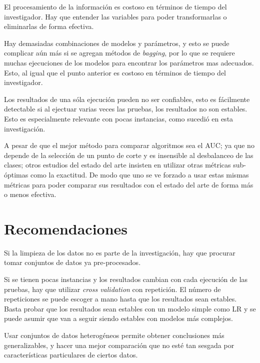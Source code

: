 El procesamiento de la información es costoso en términos de tiempo del investigador. Hay que entender las variables para poder transformarlas o eliminarlas de forma efectiva.

Hay demasiadas combinaciones de modelos y parámetros, y esto se puede complicar aún más si se agregan métodos de \textit{bagging}, por lo que se requiere muchas ejecuciones de los modelos para encontrar los parámetros mas adecuados. Esto, al igual que el punto anterior es costoso en términos de tiempo del investigador.

Los resultados de una sóla ejecución pueden no ser confiables, esto es fácilmente detectable si al ejectuar varias veces las pruebas, los resultados no son estables. Esto es especialmente relevante con pocas instancias, como sucedió en esta investigación.

A pesar de que el mejor método para comparar algoritmos sea el AUC; ya que no depende de la selección de un punto de corte y es insensible al desbalanceo de las clases; otros estudios del estado del arte insisten en utilizar otras métricas sub-óptimas como la exactitud. De modo que uno se ve forzado a usar estas mismas métricas para poder comparar sus resultados con el estado del arte de forma más o menos efectiva.


\section{Recomendaciones}

Si la limpieza de los datos no es parte de la investigación, hay que procurar tomar conjuntos de datos ya pre-procesados.

Si se tienen pocas instancias y los resultados cambian con cada ejecución de las pruebas, hay que utilizar \textit{cross validation} con repetición. El número de repeticiones se puede escoger a mano hasta que los resultados sean estables. Basta probar que los resultados sean estables con un modelo simple como \ac{LR} y se puede asumir que van a seguir siendo estables con modelos más complejos.

Usar conjuntos de datos heterogéneos permite obtener conclusiones más generalizables, y hacer una mejor comparación que no esté tan sesgada por características particulares de ciertos datos.

